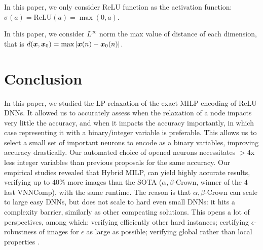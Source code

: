 \documentclass{article} %
\theoremstyle{definition}
\newcommand{\ReLU}{\mathrm{ReLU}}
\begin{document}
In this paper, we only consider $\ReLU$ function as the activation function: $\sigma(a)=\ReLU(a)=\max(0,a)$. 

In this paper, we consider $L^{\infty}$ norm the max value of distance of each dimension, that is $d({\bm{x}},\boldsymbol{x}_0)=\max |\boldsymbol{x}(n)-\boldsymbol{x}_0(n)|$. 
\fi








	







\section{Conclusion}

In this paper, we studied the LP relaxation of the exact MILP encoding of ReLU-DNNs.
It allowed us to accurately assess when the relaxation of a node impacts very little 
the accuracy, and when it impacts the accuracy importantly, in which case representing it with a binary/integer variable is preferable. This allows us to select a small set of important neurons to encode as a binary variables, improving accuracy drastically. Our automated choice of opened neurons necessitates $>4$x less integer variables than previous proposals \cite{DivideAndSlide} for the same accuracy. Our empirical studies revealed that Hybrid MILP, can yield highly accurate results, verifying up to 40\% more images than the SOTA ($\alpha,\beta$-Crown, winner of the 4 last VNNComp), with the same runtime. 
The reason is that $\alpha,\beta$-Crown can scale to large easy DNNs, but does not scale to 
hard even small DNNs: it hits a complexity barrier, similarly as other compeating solutions. This opens a lot of perspectives, among which: verifying efficiently other hard instances; certifying $\epsilon$-robustness of images for $\epsilon$ as large as possible; 
verifying global rather than local properties \cite{lipshitz}.

\newpage




\newpage

\appendix


\end{document}
